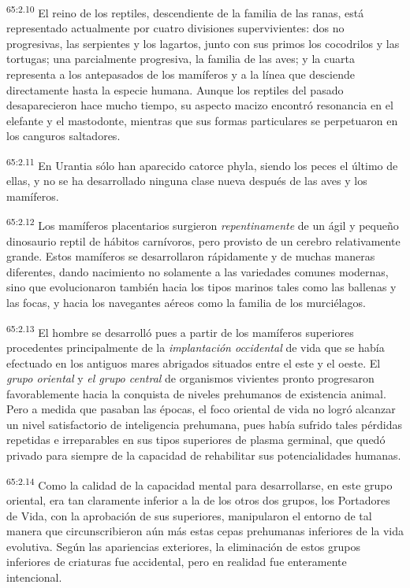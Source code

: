 \par
\textsuperscript{65:2.10} El reino de los reptiles, descendiente de la familia de las ranas, está representado actualmente por cuatro divisiones supervivientes: dos no progresivas, las serpientes y los lagartos, junto con sus primos los cocodrilos y las tortugas; una parcialmente progresiva, la familia de las aves; y la cuarta representa a los antepasados de los mamíferos y a la línea que desciende directamente hasta la especie humana. Aunque los reptiles del pasado desaparecieron hace mucho tiempo, su aspecto macizo encontró resonancia en el elefante y el mastodonte, mientras que sus formas particulares se perpetuaron en los canguros saltadores.

\par
\textsuperscript{65:2.11} En Urantia sólo han aparecido catorce phyla, siendo los peces el último de ellas, y no se ha desarrollado ninguna clase nueva después de las aves y los mamíferos.

\par
\textsuperscript{65:2.12} Los mamíferos placentarios surgieron \textit{repentinamente} de un ágil y pequeño dinosaurio reptil de hábitos carnívoros, pero provisto de un cerebro relativamente grande. Estos mamíferos se desarrollaron rápidamente y de muchas maneras diferentes, dando nacimiento no solamente a las variedades comunes modernas, sino que evolucionaron también hacia los tipos marinos tales como las ballenas y las focas, y hacia los navegantes aéreos como la familia de los murciélagos.

\par
\textsuperscript{65:2.13} El hombre se desarrolló pues a partir de los mamíferos superiores procedentes principalmente de la \textit{implantación occidental} de vida que se había efectuado en los antiguos mares abrigados situados entre el este y el oeste. El \textit{grupo oriental} y \textit{el grupo central} de organismos vivientes pronto progresaron favorablemente hacia la conquista de niveles prehumanos de existencia animal. Pero a medida que pasaban las épocas, el foco oriental de vida no logró alcanzar un nivel satisfactorio de inteligencia prehumana, pues había sufrido tales pérdidas repetidas e irreparables en sus tipos superiores de plasma germinal, que quedó privado para siempre de la capacidad de rehabilitar sus potencialidades humanas.

\par
\textsuperscript{65:2.14} Como la calidad de la capacidad mental para desarrollarse, en este grupo oriental, era tan claramente inferior a la de los otros dos grupos, los Portadores de Vida, con la aprobación de sus superiores, manipularon el entorno de tal manera que circunscribieron aún más estas cepas prehumanas inferiores de la vida evolutiva. Según las apariencias exteriores, la eliminación de estos grupos inferiores de criaturas fue accidental, pero en realidad fue enteramente intencional.

